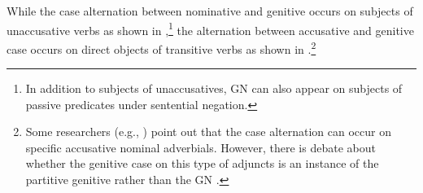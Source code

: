 \documentclass[output=paper,
colorlinks,
citecolor=brown,
newtxmath
]{langscibook}
\begin{document}
While the case alternation between nominative and genitive occurs on subjects of unaccusative verbs as shown in ,\footnote{In addition to subjects of unaccusatives, GN can also appear on subjects of passive predicates under sentential negation.
}
the alternation between accusative and genitive case occurs on direct objects of transitive verbs as shown in .\footnote{Some researchers (e.g., \citealp{Peskovskij1956,Pesetsky1982,Franks1995,Borovikoff1997,Szucsich2001,Bailyn2012}) point out that the case alternation can occur on specific accusative nominal adverbials.
However, there is debate about whether the genitive case on this type of adjuncts is an instance of the partitive genitive \citep[see][]{Franks.Dziwirek1993} rather than the GN \citep[see][]{Borovikoff1997,Pereltsvaig2000}.
}
\end{document}
